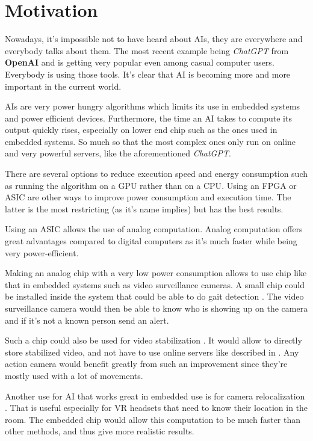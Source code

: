 \section{Motivation}
\label{sec:int_motivation}

Nowadays, it's impossible not to have heard about \acp{AI}, they are everywhere and everybody talks about them. The most recent example being \textit{ChatGPT} from \textbf{OpenAI} and is getting very popular even among casual computer users. Everybody is using those tools. It's clear that \ac{AI} is becoming more and more important in the current world.

\acp{AI} are very power hungry algorithms which limits its use in embedded systems and power efficient devices.
Furthermore, the time an \ac{AI} takes to compute its output quickly rises, especially on lower end chip such as the ones used in embedded systems. So much so that the most complex ones only run on online and very powerful servers, like the aforementioned \textit{ChatGPT}.

There are several options to reduce execution speed and energy consumption such as running the algorithm on a \ac{GPU} rather than on a \ac{CPU}. Using an \ac{FPGA} or \ac{ASIC} are other ways to improve power consumption and execution time.
The latter is the most restricting (as it's name implies) but has the best results.

Using an \ac{ASIC} allows the use of analog computation. Analog computation offers great advantages compared to digital computers as it's much faster while being very power-efficient.

Making an analog chip with a very low power consumption allows to use chip like that in embedded systems such as video surveillance cameras. A small chip could be installed inside the system that could be able to do gait detection \cite{gaitDS,gaitDig,gait}. The video surveillance camera would then be able to know who is showing up on the camera and if it's not a known person send an alert.

Such a chip could also be used for video stabilization \cite{videoStab}. It would allow to directly store stabilized video, and not have to use online servers like described in \cite{videoStab}. Any action camera would benefit greatly from such an improvement since they're mostly used with a lot of movements.

Another use for \ac{AI} that works great in embedded use is for camera relocalization \cite{videoReloc}. That is useful especially for VR headsets that need to know their location in the room. The embedded chip would allow this computation to be much faster than other methods, and thus give more realistic results.

